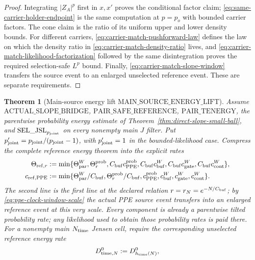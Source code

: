 \documentclass[11pt]{article}
\newtheorem{theorem}{Theorem}[section]
\begin{document}
\begin{proof}
Integrating $|Z_A|^p$ first in $x,x'$ proves the conditional factor claim;
\eqref{eq:same-carrier-holder-endpoint} is the same computation at
$p=p_o$ with bounded carrier factors.  The cone claim is the ratio of its
uniform upper and lower density bounds.  For different carriers,
\eqref{eq:carrier-match-pushforward-law} defines the law on which the density
ratio in \eqref{eq:carrier-match-density-ratio} lives, and
\eqref{eq:carrier-match-likelihood-factorization} followed by the same
disintegration proves the required selection-safe $L^p$ bound.  Finally,
\eqref{eq:carrier-match-slope-window} transfers the source event to an
enlarged unselected reference event.  These are separate requirements.
\end{proof}

\begin{theorem}[Main-source energy lift
$\mathrm{MAIN\_SOURCE\_ENERGY\_LIFT}$]
\label{thm:main-source-energy-lift}
Assume $\mathrm{ACTUAL\_SLOPE\_BRIDGE}$,
$\mathrm{PAIR\_SAFE\_REFERENCE}$, $\mathrm{PAIR\_TENERGY}$, the parentwise probability energy estimate of
Theorem~\ref{thm:direct-slope-small-ball}, and
$\mathrm{SEL\_JSL}_{p_{\rm joint}}$ on every nonempty main $J$ filter.  Put
$p_{\rm joint}'=p_{\rm joint}/(p_{\rm joint}-1)$, with
$p_{\rm joint}'=1$ in the bounded-likelihood case.  Compress the complete
reference energy theorem into the explicit rates
\begin{align}
 \Theta_{{\rm ref},r}:=\min\{&\Theta_{\rm par}^{W},
  \Theta_r^{\rm prob},C_{\rm buf}c_{\rm PPE}^{\rm prob},
  C_{\rm buf}c_{\rm buf}^{W},C_{\rm buf}c_{\rm gate}^{W},
  C_{\rm buf}c_{\rm cont}^{W}\},\notag\\
 c_{{\rm ref},{\rm PPE}}:=\min\{&\Theta_{\rm par}^{W}/C_{\rm buf},
  \Theta_r^{\rm prob}/C_{\rm buf},c_{\rm PPE}^{\rm prob},
  c_{\rm buf}^{W},c_{\rm gate}^{W},c_{\rm cont}^{W}\}.
 \label{eq:explicit-reference-energy-rates}
\end{align}
The second line is the first line at the declared relation
$r=r_N=e^{-N/C_{\rm buf}}$; by
\eqref{eq:ppe-clock-window-scale} the actual PPE source event transfers into
an enlarged reference event at this very scale.  Every component is already a parentwise
tilted probability rate; any likelihood used to obtain those probability
rates is paid there.  For a nonempty main $N_{\rm time}$ Jensen cell, require
the corresponding \emph{unselected} reference energy rate
\begin{equation}
\label{eq:unselected-time-reference-energy}
 D_{{\rm time},N}^{0}:=D_{h_{\rm time}(N)}^0,

\end{equation}
\end{theorem}
\end{document}
